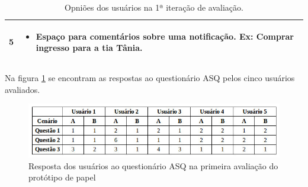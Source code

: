 \begin{table}[h]
\begin{tabular}{|m{1.5cm}||m{15cm}|}
    \hline                               
    5 & 
    \begin{itemize}
      \item Espaço para comentários sobre uma notificação. Ex: Comprar ingresso para a tia Tânia.
    \end{itemize}\\
    
    \hline
  \end{tabular}
  \caption{Opniões dos usuários na 1ª iteração de avaliação.}
  \label{opnioes1iteracao}
  \end{table}
  
  Na figura \ref{resposta_asq_1iteracao} se encontram as respostas ao questionário ASQ pelos cinco usuários avaliados.

  \begin{figure}[!htb]
  \centering
  \includegraphics[scale=0.6]{figuras/nota1avaliacao.jpg}
  \caption{Resposta dos usuários ao questionário ASQ na primeira avaliação do protótipo de papel}
  \label{resposta_asq_1iteracao}
  \end{figure}